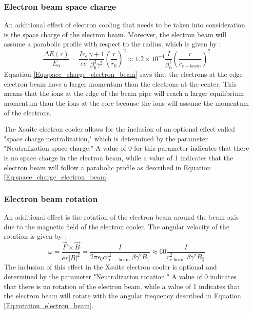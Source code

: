 \subsubsection{Electron beam space charge}

An additional effect of electron cooling that needs to be taken into consideration is the space charge of the electron beam. Moreover, the electron beam will assume a parabolic profile with respect to the radius, which is given by \cite{poth1990electron}:
\begin{equation}
\frac{\Delta E(r)}{E_0}
=\frac{I r_{\mathrm{e}}}{e c} \frac{\gamma+1}{\beta_0^3 \gamma^2}\left(\frac{r}{r_0}\right)^2
\approx 1.2 \times 10^{-4} \frac{I}{\beta_0^3}\left(\frac{r}{r_{e-beam}}\right)^2
\label{Eq:space_charge_electron_beam}
\end{equation}
Equation \ref{Eq:space_charge_electron_beam} says that the electrons at the edge electron beam have a larger momentum than the electrons at the center. This means that the ions at the edge of the beam pipe will reach a larger equilibrium momentum than the ions at the core because the ions will assume the momentum of the electrons. 

The Xsuite electron cooler allows for the inclusion of an optional effect called "space charge neutralization," which is determined by the parameter "Neutralization space charge." A value of 0 for this parameter indicates that there is no space charge in the electron beam, while a value of 1 indicates that the electron beam will follow a parabolic profile as described in Equation \ref{Eq:space_charge_electron_beam}.

\subsubsection{Electron beam rotation}

An additional effect is the rotation of the electron beam around the beam axis due to the magnetic field of the electron cooler. The angular velocity of the rotation is given by \cite{poth1990electron}:
\begin{equation}
\omega
=\frac{\vec{F} \times \vec{B}}{e r|B|^2}
=\frac{I}{2 \pi \epsilon_0 c r_{\mathrm{e}-\text { beam }}^2 \beta \gamma^2 B_{\|}}
\approx 60 \frac{I}{r_{\mathrm{e} \text {-beam }}^2 \beta \gamma^2 B_{\|}}
\label{Eq:rotation_electron_beam}
\end{equation}
The inclusion of this effect in the Xsuite electron cooler is optional and determined by the parameter "Neutralization rotation." A value of 0 indicates that there is no rotation of the electron beam, while a value of 1 indicates that the electron beam will rotate with the angular frequency described in Equation \ref{Eq:rotation_electron_beam}.


